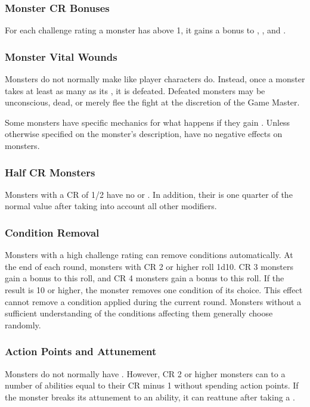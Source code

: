        \subsubsection{Monster CR Bonuses}
            For each challenge rating a monster has above 1, it gains a  bonus to , , and .

        \subsubsection{Monster Vital Wounds}
            Monsters do not normally make  like player characters do.
            Instead, once a monster takes at least as many  as its , it is defeated.
            Defeated monsters may be unconscious, dead, or merely flee the fight at the discretion of the Game Master.

            Some monsters have specific mechanics for what happens if they gain .
            Unless otherwise specified on the monster's description,  have no negative effects on monsters.

        \subsubsection{Half CR Monsters}\label{Half CR Monsters}
            Monsters with a CR of 1/2 have no  or .
            In addition, their  is one quarter of the normal value after taking into account all other modifiers.

        \subsubsection{Condition Removal}
            Monsters with a high challenge rating can remove conditions automatically.
            At the end of each round, monsters with CR 2 or higher roll 1d10.
            CR 3 monsters gain a  bonus to this roll, and CR 4 monsters gain a  bonus to this roll.
            If the result is 10 or higher, the monster removes one condition of its choice.
            This effect cannot remove a condition applied during the current round.
            Monsters without a sufficient understanding of the conditions affecting them generally choose randomly.

        \subsubsection{Action Points and Attunement}
            Monsters do not normally have .
            However, CR 2 or higher monsters can  to a number of abilities equal to their CR minus 1 without spending action points.
            If the monster breaks its attunement to an ability, it can reattune after taking a .


